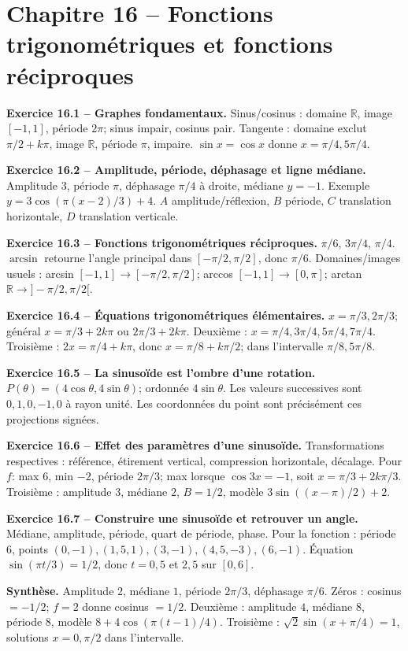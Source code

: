 \documentclass[11pt,a4paper,openany]{book}
\newcommand{\R}{\mathbb{R}}\newcommand{\N}{\mathbb{N}}\newcommand{\Z}{\mathbb{Z}}\newcommand{\Q}{\mathbb{Q}}
\begin{document}
\chapter*{Chapitre 16 -- Fonctions trigonométriques et fonctions réciproques}
\begin{answerbox}
\textbf{Exercice 16.1 -- Graphes fondamentaux.} Sinus/cosinus : domaine $\R$, image $[-1,1]$, période $2\pi$; sinus impair, cosinus pair. Tangente : domaine exclut $\pi/2+k\pi$, image $\R$, période $\pi$, impaire. $\sin x=\cos x$ donne $x=\pi/4,5\pi/4$.\par
\textbf{Exercice 16.2 -- Amplitude, période, déphasage et ligne médiane.} Amplitude $3$, période $\pi$, déphasage $\pi/4$ à droite, médiane $y=-1$. Exemple $y=3\cos(\pi(x-2)/3)+4$. $A$ amplitude/réflexion, $B$ période, $C$ translation horizontale, $D$ translation verticale.\par
\textbf{Exercice 16.3 -- Fonctions trigonométriques réciproques.} $\pi/6$, $3\pi/4$, $\pi/4$. $\arcsin$ retourne l'angle principal dans $[-\pi/2,\pi/2]$, donc $\pi/6$. Domaines/images usuels : arcsin $[-1,1]\to[-\pi/2,\pi/2]$; arccos $[-1,1]\to[0,\pi]$; arctan $\R\to]-\pi/2,\pi/2[$.\par
\textbf{Exercice 16.4 -- Équations trigonométriques élémentaires.} $x=\pi/3,2\pi/3$; général $x=\pi/3+2k\pi$ ou $2\pi/3+2k\pi$. Deuxième : $x=\pi/4,3\pi/4,5\pi/4,7\pi/4$. Troisième : $2x=\pi/4+k\pi$, donc $x=\pi/8+k\pi/2$; dans l'intervalle $\pi/8,5\pi/8$.\par
\textbf{Exercice 16.5 -- La sinusoïde est l'ombre d'une rotation.} $P(\theta)=(4\cos\theta,4\sin\theta)$; ordonnée $4\sin\theta$. Les valeurs successives sont $0,1,0,-1,0$ à rayon unité. Les coordonnées du point sont précisément ces projections signées.\par
\textbf{Exercice 16.6 -- Effet des paramètres d'une sinusoïde.} Transformations respectives : référence, étirement vertical, compression horizontale, décalage. Pour $f$: max $6$, min $-2$, période $2\pi/3$; max lorsque $\cos3x=-1$, soit $x=\pi/3+2k\pi/3$. Troisième : amplitude $3$, médiane $2$, $B=1/2$, modèle $3\sin((x-\pi)/2)+2$.\par
\textbf{Exercice 16.7 -- Construire une sinusoïde et retrouver un angle.} Médiane, amplitude, période, quart de période, phase. Pour la fonction : période $6$, points $(0,-1),(1{,}5,1),(3,-1),(4{,}5,-3),(6,-1)$. Équation $\sin(\pi t/3)=1/2$, donc $t=0{,}5$ et $2{,}5$ sur $[0,6]$.\par
\medskip\textbf{Synthèse.} Amplitude $2$, médiane $1$, période $2\pi/3$, déphasage $\pi/6$. Zéros : cosinus $=-1/2$; $f=2$ donne cosinus $=1/2$. Deuxième : amplitude $4$, médiane $8$, période $8$, modèle $8+4\cos(\pi(t-1)/4)$. Troisième : $\sqrt2\sin(x+\pi/4)=1$, solutions $x=0,\pi/2$ dans l'intervalle.
\end{answerbox}
\end{document}
